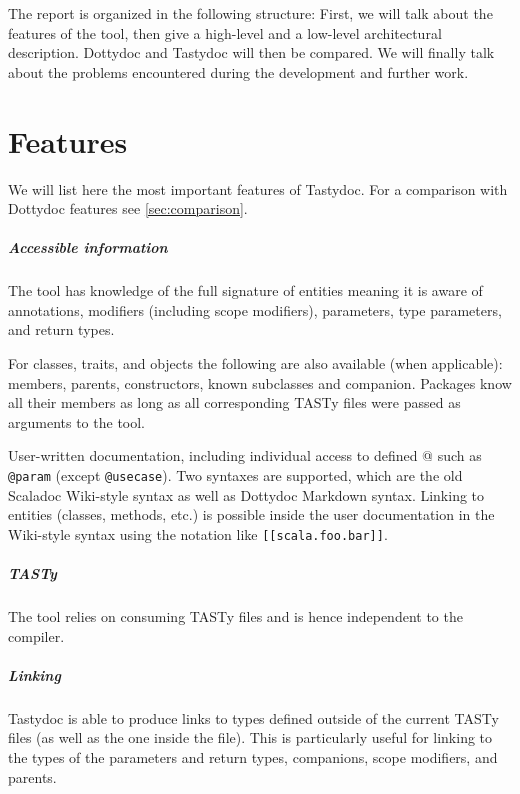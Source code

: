 \documentclass{report}
\begin{document}
The report is organized in the following structure: First, we will talk about the features of the tool, then give a high-level and a low-level architectural description. Dottydoc and Tastydoc will then be compared. We will finally talk about the problems encountered during the development and further work.

\chapter{Features}
We will list here the most important features of Tastydoc. For a comparison with Dottydoc features see \autoref{sec:comparison}.

\paragraph{Accessible information}
The tool has knowledge of the full signature of entities meaning it is aware of annotations, modifiers (including scope modifiers), parameters, type parameters, and return types.

For classes, traits, and objects the following are also available (when applicable): members, parents, constructors, known subclasses and companion.
Packages know all their members as long as all corresponding TASTy files were passed as arguments to the tool.

User-written documentation, including individual access to defined @ such as \texttt{@param} (except \texttt{@usecase}). Two syntaxes are supported, which are the old Scaladoc Wiki-style syntax as well as Dottydoc Markdown syntax. Linking to entities (classes, methods, etc.) is possible inside the user documentation in the Wiki-style syntax using the notation like \texttt{[[scala.foo.bar]]}.

\paragraph{TASTy}
The tool relies on consuming TASTy files and is hence independent to the compiler.

\paragraph{Linking}
Tastydoc is able to produce links to types defined outside of the current TASTy files (as well as the one inside the file). This is particularly useful for linking to the types of the parameters and return types, companions, scope modifiers, and parents.
\end{document}
